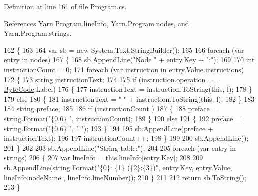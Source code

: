 Definition at line 161 of file Program.\-cs.



References Yarn.\-Program.\-line\-Info, Yarn.\-Program.\-nodes, and Yarn.\-Program.\-strings.


\begin{DoxyCode}
162         \{
163 
164             var sb = \textcolor{keyword}{new} System.Text.StringBuilder();
165 
166             \textcolor{keywordflow}{foreach} (var entry \textcolor{keywordflow}{in} \hyperlink{a00146_a3f4928a577c88263ad016be259b175c4}{nodes})
167             \{
168                 sb.AppendLine(\textcolor{stringliteral}{"Node "} + entry.Key + \textcolor{stringliteral}{":"});
169 
170                 \textcolor{keywordtype}{int} instructionCount = 0;
171                 \textcolor{keywordflow}{foreach} (var instruction \textcolor{keywordflow}{in} entry.Value.instructions)
172                 \{
173                     \textcolor{keywordtype}{string} instructionText;
174 
175                     \textcolor{keywordflow}{if} (instruction.operation == \hyperlink{a00045_ad5dfb6ee68ca7469623ad3e459f98894}{ByteCode}.Label)
176                     \{
177                         instructionText = instruction.ToString(\textcolor{keyword}{this}, l);
178                     \}
179                     \textcolor{keywordflow}{else}
180                     \{
181                         instructionText = \textcolor{stringliteral}{"    "} + instruction.ToString(\textcolor{keyword}{this}, l);
182                     \}
183 
184                     \textcolor{keywordtype}{string} preface;
185 
186                     \textcolor{keywordflow}{if} (instructionCount %
      )
187                     \{
188                         preface = string.Format(\textcolor{stringliteral}{"\{0,6\}   "}, instructionCount);
189                     \}
190                     \textcolor{keywordflow}{else}
191                     \{
192                         preface = string.Format(\textcolor{stringliteral}{"\{0,6\}   "}, \textcolor{stringliteral}{" "});
193                     \}
194 
195                     sb.AppendLine(preface + instructionText);
196 
197                     instructionCount++;
198                 \}
199 
200                 sb.AppendLine();
201             \}
202 
203             sb.AppendLine(\textcolor{stringliteral}{"String table:"});
204 
205             \textcolor{keywordflow}{foreach} (var entry \textcolor{keywordflow}{in} \hyperlink{a00146_a59263e00cecfe36d9881b4c30b048f09}{strings})
206             \{
207                 var \hyperlink{a00146_a0d4da395947767b4a1eaaff8a9842adc}{lineInfo} = this.lineInfo[entry.Key];
208 
209                 sb.AppendLine(string.Format(\textcolor{stringliteral}{"\{0\}: \{1\} (\{2\}:\{3\})"}, entry.Key, entry.Value, lineInfo.nodeName
      , lineInfo.lineNumber));
210             \}
211 
212             \textcolor{keywordflow}{return} sb.ToString();
213         \}
\end{DoxyCode}
